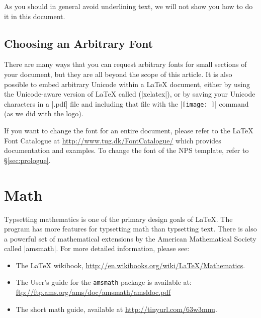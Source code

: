 As you should in general avoid underlining text, we will not show you
how to do it in this document.

\subsection{Choosing an Arbitrary Font}

There are many ways that you can request arbitrary fonts for small sections of
your document, but they are all beyond the scope of this article. It is also
possible to embed arbitrary Unicode within a \LaTeX{} document, either by using
the Unicode-aware version of \LaTeX{} called
 (|xelatex|), or
by saving your Unicode characters in a |.pdf| file and including that file with
the |\texttt{[image: ]}| command (as we did with the
 logo).

If you want to change the font for an entire document, please refer to the
\LaTeX{} Font Catalogue at \url{http://www.tug.dk/FontCatalogue/} which
provides documentation and examples.  To change the font of the NPS template,
refer to \S\ref{sec:prologue}.

\section{Math}\label{math}

Typsetting mathematics is one of the primary design goals of \LaTeX. The
program  has more features for typsetting math than typsetting text. There is
also a powerful set of mathematical extensions by the American Mathematical
Society called |amsmath|.  For more detailed information, please see:

\begin{itemize}
\item The \LaTeX{} wikibook,
  \url{http://en.wikibooks.org/wiki/LaTeX/Mathematics}.  
\item The User's guide for the \texttt{amsmath} package is available at:
\url{ftp://ftp.ams.org/ams/doc/amsmath/amsldoc.pdf}
\item The short math guide, available at
  \url{http://tinyurl.com/63w3mnu}.
\end{itemize}

